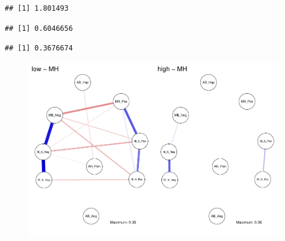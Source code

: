 \documentclass[man,floatsintext]{apa6}
\begin{document}
\begin{verbatim}
## [1] 1.801493
\end{verbatim}

\begin{verbatim}
## [1] 0.6046656
\end{verbatim}

\begin{verbatim}
## [1] 0.3676674
\end{verbatim}

\begin{figure}
\centering
\includegraphics{script_files/figure-latex/glasso networks-2.pdf}
\caption{}
\end{figure}
\end{document}
